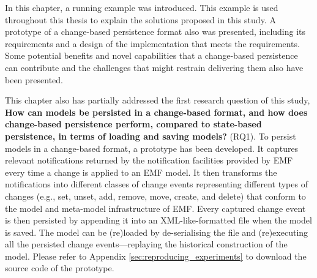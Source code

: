 In this chapter, a running example was introduced. This example is used throughout this thesis to explain the solutions proposed in this study. A prototype of a change-based persistence format also was presented, including its requirements and a design of the implementation that meets the requirements. Some potential benefits and novel capabilities that a change-based persistence can contribute and the challenges that might restrain delivering them also have been presented.

This chapter also has partially addressed the first research question of this study, \textbf{How can models be persisted in a change-based format, and how does change-based persistence perform, compared to state-based persistence, in terms of loading and saving models?} (RQ1). To persist models in a change-based format, a prototype has been developed. It captures relevant notifications returned by the notification facilities provided by EMF every time a change is applied to an EMF model. It then transforms the notifications into different classes of change events representing different types of changes (e.g., set, unset, add, remove, move, create, and delete) that conform to the model and meta-model infrastructure of EMF. Every captured change event is then persisted by appending it into an XML-like-formatted file when the model is saved. The model can be (re)loaded by de-serialising the file and (re)executing all the persisted change events—replaying the historical construction of the model. Please refer to Appendix \ref{sec:reproducing_experiments} to download the source code of the prototype.

